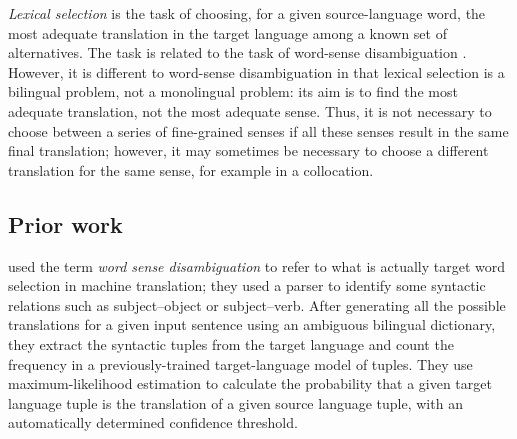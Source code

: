 \documentclass[11pt]{article}
\newcommand{\comment}[1]{\todo{#1}}
\begin{document}
\emph{Lexical selection} is the task of choosing, for a given source-language
word, the most adequate translation in the target language among a
known set of alternatives.  The task is related to the task of
word-sense disambiguation \citep{ide98a}. However, it is different to
word-sense disambiguation in that lexical selection is a bilingual
problem, not a monolingual problem: its aim is to find the most
adequate translation, not the most adequate sense. Thus, it is not
necessary to choose between a series of fine-grained senses if all
these senses result in the same final translation; however, it may sometimes
be necessary to choose a different translation for the same sense, for
example in a collocation.


\subsection{Prior work}
\cite{dagan1994word} used the term
\emph{word sense disambiguation} to refer to what is actually target
word selection in machine translation; they used a parser to identify
some syntactic relations such as subject--object or subject--verb.
After generating all the possible translations for a given
input sentence using an ambiguous bilingual dictionary, they extract the syntactic
tuples from the target language and count the frequency in a previously-trained target-language 
model of tuples.  They use maximum-likelihood estimation to calculate the probability that a given 
target language tuple is the translation of a given source language tuple, with
an automatically determined confidence threshold.
\end{document}
